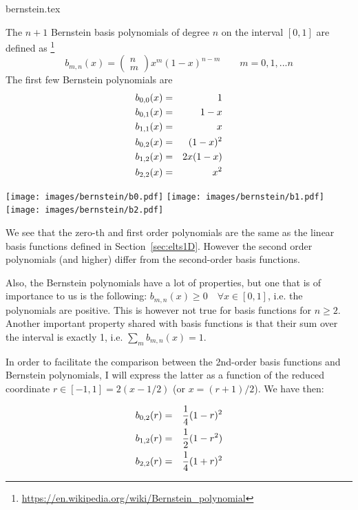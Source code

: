\begin{flushright} {\tiny {\color{gray} bernstein.tex}} \end{flushright}


The $n+1$ Bernstein basis polynomials of degree $n$ on the interval $[0,1]$
are defined as \footnote{\url{https://en.wikipedia.org/wiki/Bernstein_polynomial}}
\[
b_{m,n}(x) = \left( \begin{array}{c} n \\ m \end{array}\right) x^m(1-x)^{n-m}
\qquad m=0,1,...n
\]
The first few Bernstein polynomials are 
\begin{eqnarray}
b_{0,0}(x) &=& 1 \\
b_{0,1}(x) &=& 1-x \nonumber\\
b_{1,1}(x) &=& x \\
b_{0,2}(x) &=& (1-x)^2 \nonumber\\
b_{1,2}(x) &=& 2x(1-x) \nonumber\\
b_{2,2}(x) &=& x^2 
\end{eqnarray}

\texttt{[image: images/bernstein/b0.pdf]}
\texttt{[image: images/bernstein/b1.pdf]}
\texttt{[image: images/bernstein/b2.pdf]}

We see that the zero-th and first order polynomials are the same as the linear basis functions defined in 
Section~\ref{sec:elts1D}. However the second order polynomials (and higher) differ from the second-order
basis functions. 

Also, the Bernstein polynomials have a lot of properties, but one that is of importance to us
is the following: $b_{m,n}(x) \geq 0 \quad  \forall x\in [0,1]$, i.e. the polynomials 
are positive. This is however not true for basis functions for $n\geq 2$.
Another important property shared with basis functions is that their sum over the interval is 
exactly 1, i.e. $\sum_m b_{m,n}(x)=1$.

In order to facilitate the comparison between the 2nd-order basis functions and Bernstein 
polynomials, I will express the latter as a function of the reduced coordinate
$r\in[-1,1]=2(x-1/2)$ (or $x=(r+1)/2$). We have then:

\begin{eqnarray}
b_{0,2}(r) &=& \frac{1}{4}(1-r)^2 \nonumber\\
b_{1,2}(r) &=& \frac{1}{2}(1-r^2) \nonumber\\
b_{2,2}(r) &=& \frac{1}{4}(1+r)^2
\end{eqnarray}

